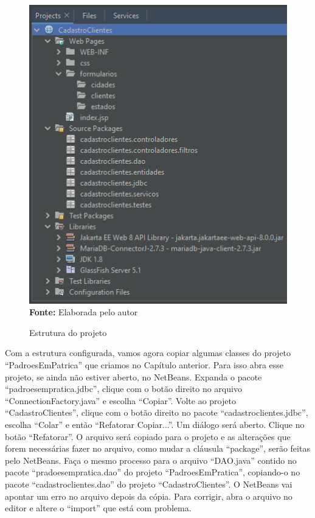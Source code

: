 \FloatBarrier
\begin{figure}[!htbp]
    \centering
    \caption{Estrutura do projeto}
    \includegraphics[scale=0.8]{imagens/cap05EstruturaProjeto}
    \\\textbf{Fonte:} Elaborada pelo autor
    \label{fig:cap05EstruturaProjeto}
\end{figure}
\FloatBarrier

Com a estrutura configurada, vamos agora copiar algumas classes do projeto ``PadroesEmPatrica'' que criamos no Capítulo anterior. Para isso abra esse projeto, se ainda não estiver aberto, no NetBeans. Expanda o pacote ``padroesempratica.jdbc'', clique com o botão direito no arquivo ``ConnectionFactory.java'' e escolha ``Copiar''. Volte ao projeto ``CadastroClientes'', clique com o botão direito no pacote ``cadastroclientes.jdbc'', escolha ``Colar'' e então ``Refatorar Copiar...''. Um diálogo será aberto. Clique no botão ``Refatorar''. O arquivo será copiado para o projeto e as alterações que forem necessárias fazer no arquivo, como mudar a cláusula ``package'', serão feitas pelo NetBeans. Faça o mesmo processo para o arquivo ``DAO.java'' contido no pacote ``pradoesempratica.dao'' do projeto ``PadroesEmPratica'', copiando-o no pacote ``cadastroclientes.dao'' do projeto ``CadastroClientes''. O NetBeans vai apontar um erro no arquivo depois da cópia. Para corrigir, abra o arquivo no editor e altere o ``import'' que está com problema. 


